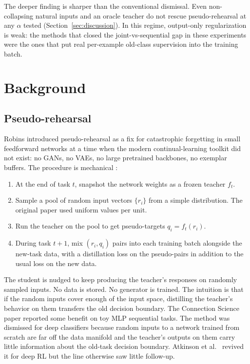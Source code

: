 \documentclass[conference]{IEEEtran}
\begin{document}
The deeper finding is sharper than the conventional dismissal. Even
non-collapsing natural inputs and an oracle teacher do not rescue
pseudo-rehearsal at any $\alpha$ tested
(Section~\ref{sec:discussion}). In this regime, output-only
regularization is weak: the methods that closed the joint-vs-sequential
gap in these experiments were the ones that put real per-example
old-class supervision into the training batch.

\section{Background}

\subsection{Pseudo-rehearsal}

Robins introduced pseudo-rehearsal as a fix for catastrophic forgetting
in small feedforward networks at a time when the modern continual-learning
toolkit did not exist: no GANs, no VAEs, no large pretrained backbones,
no exemplar buffers. The procedure is mechanical
\citep{robins1995pseudorehearsal}:
\begin{enumerate}
\item At the end of task $t$, snapshot the network weights as a frozen
teacher $f_t$.
\item Sample a pool of random input vectors $\{r_i\}$ from a simple
distribution. The original paper used uniform values per unit.
\item Run the teacher on the pool to get pseudo-targets
$q_i = f_t(r_i)$.
\item During task $t{+}1$, mix $(r_i, q_i)$ pairs into each training
batch alongside the new-task data, with a distillation loss on the
pseudo-pairs in addition to the usual loss on the new data.
\end{enumerate}
The student is nudged to keep producing the teacher's responses on
randomly sampled inputs. No data is stored. No generator is trained. The
intuition is that if the random inputs cover enough of the input space,
distilling the teacher's behavior on them transfers the old decision
boundary. The Connection Science paper reported some benefit on toy MLP
sequential tasks. The method was dismissed for deep classifiers because
random inputs to a network trained from scratch are far off the data
manifold and the teacher's outputs on them carry little information
about the old-task decision boundary. Atkinson et al.\
\citep{atkinson2018pseudorehearsal} revived it for deep RL but the line
otherwise saw little follow-up.
\end{document}
